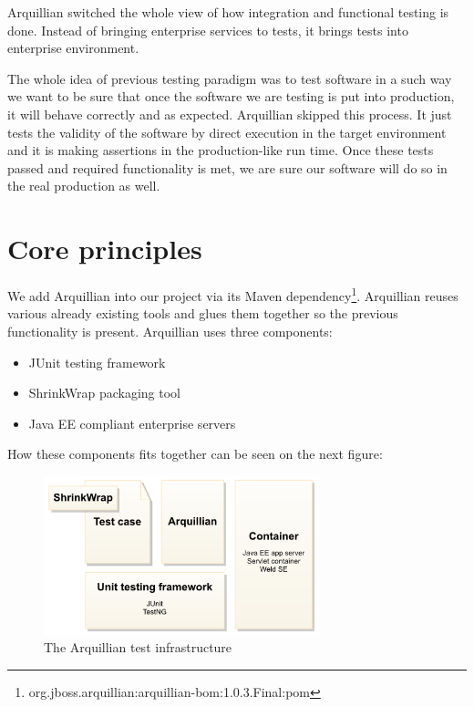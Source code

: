 \documentclass[12pt,final,oneside]{fithesis}
\begin{document}
Arquillian switched the whole view of how integration and functional testing is done. Instead of bringing enterprise services to tests, it brings tests into enterprise environment.

The whole idea of previous testing paradigm was to test software in a such way we want to be sure that once the software we are testing is put into production, it will behave correctly and as expected. Arquillian skipped this process. It just tests the validity of the software by direct execution in the target environment and it is making assertions in the production-like run time. Once these tests passed and required functionality is met, we are sure our software will do so in the real production as well.

	\section{Core principles}
	
We add Arquillian into our project via its Maven dependency\footnote{org.jboss.arquillian:arquillian-bom:1.0.3.Final:pom}. Arquillian reuses various already existing tools and glues them together so the previous functionality is present. Arquillian uses three components:

\begin{itemize}
	\item{JUnit testing framework}
	\item{ShrinkWrap packaging tool}
	\item{Java EE compliant enterprise servers}
\end{itemize}

How these components fits together can be seen on the next figure:

\begin{figure}[!ht]
	\centering
	\includegraphics[width=80mm]{img/architecture-overview.png}
	\caption{The Arquillian test infrastructure\cite{bib090}}
	\label{fig:arquillian_test_infrastructure}
\end{figure}
\end{document}
